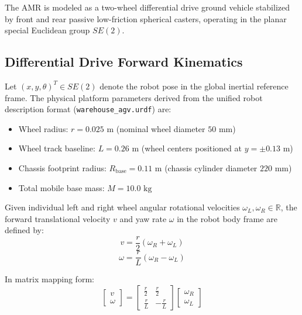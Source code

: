 \documentclass[10pt,a4paper]{article}
\begin{document}
The AMR is modeled as a two-wheel differential drive ground vehicle stabilized by front and rear passive low-friction spherical casters, operating in the planar special Euclidean group $SE(2)$.

\subsection{Differential Drive Forward Kinematics}
Let $(x, y, \theta)^T \in SE(2)$ denote the robot pose in the global inertial reference frame. The physical platform parameters derived from the unified robot description format (\texttt{warehouse\_agv.urdf}) are:
\begin{itemize}
    \item Wheel radius: $r = 0.025\text{ m}$ (nominal wheel diameter $50\text{ mm}$)
    \item Wheel track baseline: $L = 0.26\text{ m}$ (wheel centers positioned at $y = \pm 0.13\text{ m}$)
    \item Chassis footprint radius: $R_{\text{base}} = 0.11\text{ m}$ (chassis cylinder diameter $220\text{ mm}$)
    \item Total mobile base mass: $M = 10.0\text{ kg}$
\end{itemize}

Given individual left and right wheel angular rotational velocities $\omega_L, \omega_R \in \mathbb{R}$, the forward translational velocity $v$ and yaw rate $\omega$ in the robot body frame are defined by:
\begin{equation}
v = \frac{r}{2} (\omega_R + \omega_L)
\end{equation}
\begin{equation}
\omega = \frac{r}{L} (\omega_R - \omega_L)
\end{equation}

In matrix mapping form:
\begin{equation}
\begin{bmatrix} v \\ \omega \end{bmatrix} = \begin{bmatrix} \frac{r}{2} & \frac{r}{2} \\ \frac{r}{L} & -\frac{r}{L} \end{bmatrix} \begin{bmatrix} \omega_R \\ \omega_L \end{bmatrix}
\end{equation}
\end{document}
